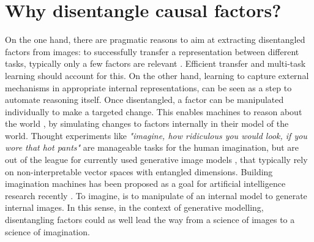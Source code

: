 \section{Why disentangle causal factors?}
	On the one hand, there are pragmatic reasons to aim at extracting disentangled factors from images: to successfully transfer a representation between different tasks, typically only a few factors are relevant \cite{bengio13rep}.
	Efficient transfer and multi-task learning should account for this.
	On the other hand, learning to capture external mechanisms in appropriate internal representations, can be seen as a step to automate reasoning itself.
	Once disentangled, a factor can be manipulated individually to make a targeted change.
	This enables machines to reason about the world \cite{pearl18impediments}, by simulating changes to factors internally in their model of the world.
	Thought experiments like \textit{"imagine, how ridiculous you would look, if you wore that hot pants"} are manageable tasks for the human imagination, but are out of the league for currently used generative image models \cite{goodfellow14gan, kingma13vae}, that typically rely on non-interpretable vector spaces with entangled dimensions.
	Building imagination machines has been proposed as a goal for artificial intelligence research recently \cite{mahadevan18imagine}.
	To imagine, is to manipulate of an internal model to generate internal images.
	In this sense, in the context of generative modelling, disentangling factors could as well lead the way from a science of images to a science of imagination.


